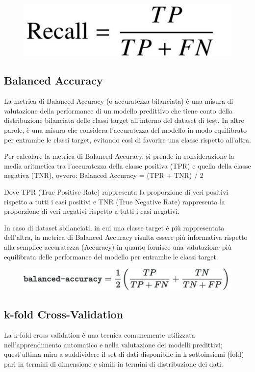 \begin{figure}
    \begin{center}    
        \includegraphics[width=0.5\linewidth]{images/image49.jpeg}
    \end{center}
\end{figure}

\subsection{Balanced Accuracy}
La metrica di Balanced Accuracy (o accuratezza bilanciata) è una misura di valutazione della performance di un modello predittivo che tiene conto della distribuzione bilanciata delle classi target all'interno del dataset di test. In altre parole, è una misura che considera l'accuratezza del modello in modo equilibrato per entrambe le classi target, evitando così di favorire una classe rispetto all'altra.

Per calcolare la metrica di Balanced Accuracy, si prende in considerazione la media aritmetica tra l'accuratezza della classe positiva (TPR) e quella della classe negativa (TNR), ovvero:
Balanced Accuracy = (TPR + TNR) / 2
 
Dove TPR (True Positive Rate) rappresenta la proporzione di veri positivi rispetto a tutti i casi positivi e TNR (True Negative Rate) rappresenta la proporzione di veri negativi rispetto a tutti i casi negativi.

In caso di dataset sbilanciati, in cui una classe target è più rappresentata dell'altra, la metrica di Balanced Accuracy risulta essere più informativa rispetto alla semplice accuratezza (Accuracy) in quanto fornisce una valutazione più equilibrata delle performance del modello per entrambe le classi target.

\begin{figure}
    \begin{center}    
        \includegraphics[width=0.9\linewidth]{images/image50.jpeg}
    \end{center}
\end{figure}

\subsection{k-fold Cross-Validation}
La k-fold cross validation è una tecnica comunemente utilizzata nell'apprendimento automatico e nella valutazione dei modelli predittivi; quest’ultima mira a suddividere il set di dati disponibile in k sottoinsiemi (fold) pari in termini di dimensione e simili in termini di distribuzione dei dati. 

